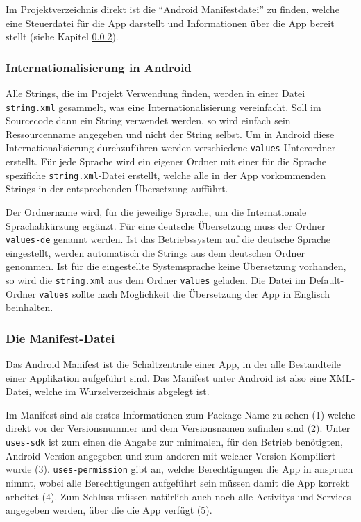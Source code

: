 Im Projektverzeichnis direkt ist die "`Android Manifestdatei"' zu finden, welche eine Steuerdatei f\"ur die App darstellt und Informationen \"uber die App bereit stellt (siehe Kapitel \ref{Die Manifest-Datei}).
\cite{GolemHBRessourcen}

\subsubsection{Internationalisierung in Android} \label{Internationalisierung in Android}
Alle Strings, die im Projekt Verwendung finden, werden in einer Datei \texttt{string.xml} gesammelt, was eine Internationalisierung vereinfacht. Soll im Sourcecode dann ein String verwendet werden, so wird einfach sein Ressourcenname angegeben und nicht der String selbst. Um in Android diese Internationalisierung durchzuf\"uhren werden verschiedene \texttt{values}-Unterordner erstellt. F\"ur jede Sprache wird ein eigener Ordner mit einer f\"ur die Sprache spezifiche \texttt{string.xml}-Datei erstellt, welche alle in der App vorkommenden Strings in der entsprechenden \"Ubersetzung auff\"uhrt. 

Der Ordnername wird, f\"ur die jeweilige Sprache, um die Internationale Sprachabk\"urzung erg\"anzt. F\"ur eine deutsche \"Ubersetzung muss der Ordner \texttt{values-de} genannt werden. Ist das Betriebssystem auf die deutsche Sprache eingestellt, werden automatisch die Strings aus dem deutschen Ordner genommen. Ist f\"ur die eingestellte Systemsprache keine \"Ubersetzung vorhanden, so wird die \texttt{string.xml} aus dem Ordner \texttt{values} geladen. Die Datei im Default-Ordner \texttt{values} sollte nach M\"oglichkeit die \"Ubersetzung der App in Englisch beinhalten. \cite{VogelaI18N}
% 

\subsubsection{Die Manifest-Datei} \label{Die Manifest-Datei}
Das Android Manifest ist die Schaltzentrale einer App, in der alle Bestandteile einer Applikation aufgef\"uhrt sind. Das Manifest unter Android ist also eine XML-Datei, welche im Wurzelverzeichnis abgelegt ist. 

Im Manifest sind als erstes Informationen zum Package-Name zu sehen (1) welche direkt vor der Versionsnummer und dem Versionsnamen zufinden sind (2). Unter \texttt{uses-sdk} ist zum einen die Angabe zur minimalen, f\"ur den Betrieb ben\"otigten, Android-Version angegeben und zum anderen mit welcher Version Kompiliert wurde (3). \texttt{uses-permission} gibt an, welche Berechtigungen die App in anspruch nimmt, wobei alle Berechtigungen aufgef\"uhrt sein m\"ussen damit die App korrekt arbeitet (4). Zum Schluss m\"ussen nat\"urlich auch noch alle Activitys und Services angegeben werden, \"uber die die App verf\"ugt (5).
\cite{Android44}

